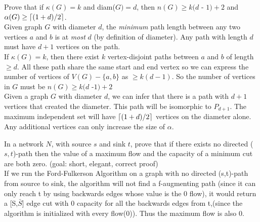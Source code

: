 \documentclass[12pt]{article}
\DeclarePairedDelimiter{\ceil}{\lceil}{\rceil}
\newenvironment{question}[2][Question]{\begin{trivlist}
\item[\hskip \labelsep {\bfseries #1}\hskip \labelsep {\bfseries #2.}]}{\end{trivlist}}
\begin{document}
\begin{question}{8}
Prove that if $\kappa(G) = k$ and diam($G) = d$, then $n(G) \geq k(d$ - $ 1) + 2$ and $\alpha(G) \geq \ceil[big]{(1 + d)/2}$.\\

Given graph $G$ with diameter $d$, the \textit{minimum} path length between any two vertices $a$ and $b$ is at \textit{most} $d$ (by definition of diameter). Any path with length $d$ must have $d+1$ vertices on the path.\\

If $\kappa(G) = k$, then there exist $k$ vertex-disjoint paths between $a$ and $b$ of length $\geq d$. All these path share the same start and end vertex so we can express the number of vertices of $V(G)-\{a,b\}$ as $\geq k(d-1)$. So the number of vertices in $G$ must be $n(G) \geq k(d$ -$1) +2$\\


Given a graph $G$ with diameter $d$, we can infer that there is a path with $d+1$ vertices that created the diameter.  This path will be isomorphic to $P_{d+1}$.  The maximum independent set will have $\ceil[big]{(1 + d)/2}$ vertices on the diameter alone.  Any additional vertices can only increase the size of $\alpha$. \\



\end{question}

\begin{question}{9}
In a network $N$, with source $s$ and sink $t$, prove that if there exists no directed ($s, t$)-path then the value of a maximum flow and the capacity of a minimum cut are both zero. (goal: short, elegant, correct proof) \\

If we run the Ford-Fulkerson Algorithm on a graph with no directed (s,t)-path from source to sink, the algorithm will not find a f-augmenting path (since it can only reach t by using backwards edges whose value is the 0 flow), it would return a [S,$\bar{S}$] edge cut with 0 capacity for all the backwards edges from t,(since the algorithm is initialized with every flow(0)). Thus the maximum flow is also 0. \\
\end{question}
\end{document}
